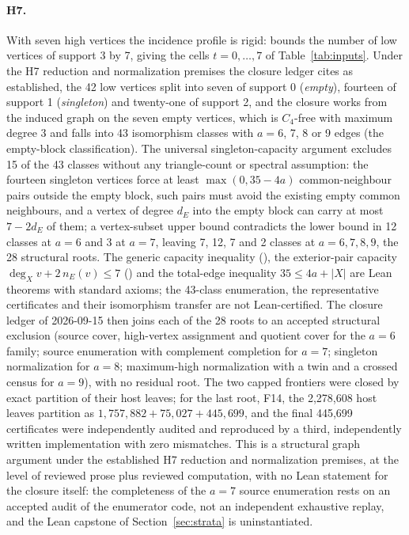 \documentclass{anvil-paper}
\theoremstyle{definition}
\begin{document}
\paragraph{H7.} With seven high vertices the incidence profile is rigid:  bounds the number of low vertices of support 3 by 7, giving the cells $t=0,\dots,7$ of Table~\ref{tab:inputs}. Under the H7 reduction and normalization premises the closure ledger cites as established, the 42 low vertices split into seven of support 0 (\emph{empty}), fourteen of support 1 (\emph{singleton}) and twenty-one of support 2, and the closure works from the induced graph on the seven empty vertices, which is $C_4$-free with maximum degree 3 and falls into 43 isomorphism classes with $a=6$, 7, 8 or 9 edges (the empty-block classification). The universal singleton-capacity argument excludes 15 of the 43 classes without any triangle-count or spectral assumption: the fourteen singleton vertices force at least $\max(0,35-4a)$ common-neighbour pairs outside the empty block, such pairs must avoid the existing empty common neighbours, and a vertex of degree $d_E$ into the empty block can carry at most $7-2d_E$ of them; a vertex-subset upper bound contradicts the lower bound in 12 classes at $a=6$ and 3 at $a=7$, leaving 7, 12, 7 and 2 classes at $a=6,7,8,9$, the 28 structural roots. The generic capacity inequality (), the exterior-pair capacity $\deg_X v+2\,n_E(v)\le 7$ () and the total-edge inequality $35\le 4a+|X|$ are Lean theorems with standard axioms; the 43-class enumeration, the representative certificates and their isomorphism transfer are not Lean-certified. The closure ledger of 2026-09-15 then joins each of the 28 roots to an accepted structural exclusion (source cover, high-vertex assignment and quotient cover for the $a=6$ family; source enumeration with complement completion for $a=7$; singleton normalization for $a=8$; maximum-high normalization with a twin and a crossed census for $a=9$), with no residual root. The two capped frontiers were closed by exact partition of their host leaves; for the last root, F14, the 2,278,608 host leaves partition as $1{,}757{,}882+75{,}027+445{,}699$, and the final 445,699 certificates were independently audited and reproduced by a third, independently written implementation with zero mismatches. This is a structural graph argument under the established H7 reduction and normalization premises, at the level of reviewed prose plus reviewed computation, with no Lean statement for the closure itself: the completeness of the $a=7$ source enumeration rests on an accepted audit of the enumerator code, not an independent exhaustive replay, and the Lean capstone of Section~\ref{sec:strata} is uninstantiated.
\end{document}
